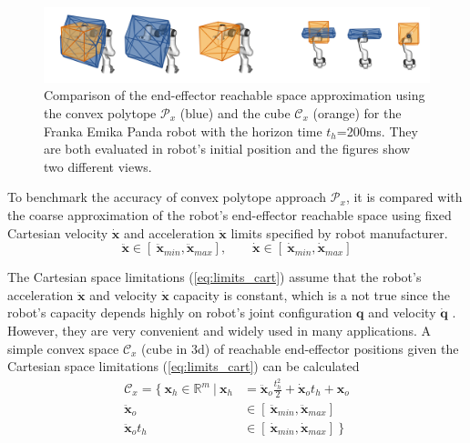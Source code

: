 \begin{figure}[!h]
    \centering
    \includegraphics[width=\linewidth]{Papers/images/comp_200.png}
    \caption{Comparison of the end-effector reachable space approximation using the convex polytope $\mathcal{P}_x$ (blue) and the cube $\mathcal{C}_x$ (orange) for the Franka Emika Panda robot with the horizon time $t_h$=200ms. They are both evaluated in robot's initial position and the figures show two different views.}
    \label{fig:cube}
\end{figure}
To benchmark the accuracy of convex polytope approach $\mathcal{P}_x$, it is compared with the coarse approximation of the robot's end-effector reachable space using fixed Cartesian velocity $\dot{\bm{x}}$ and acceleration $\ddot{\bm{x}}$ limits specified by robot manufacturer.
\begin{equation}
    \ddot{\bm{x}}\in [~ \ddot{\bm{x}}_{min},  \ddot{\bm{x}}_{max}], \qquad \dot{\bm{x}} \in [~ \dot{\bm{x}}_{min},  \dot{\bm{x}}_{max}]
    \label{eq:limits_cart}
\end{equation}



The Cartesian space limitations (\ref{eq:limits_cart}) assume that the robot's acceleration $\ddot{\bm{x}}$ and velocity $\dot{\bm{x}}$ capacity is constant, which is a not true since the robot's capacity depends highly on robot's joint configuration $\bm{q}$ and velocity  $\dot{\bm{q}}$ \cite{Bowling2005}. However, they are very convenient and widely used in many applications. A simple convex space $\mathcal{C}_x$ (cube in 3d) of reachable end-effector positions given the Cartesian space limitations (\ref{eq:limits_cart}) can be calculated
\begin{equation}
\begin{split}
    \mathcal{C}_x = \{ ~\bm{x}_h \in \mathbb{R}^m ~|~ \bm{x}_h &= \ddot{\bm{x}}_o\frac{t_h^2}{2} + \dot{\bm{x}}_ot_h + \bm{x}_o \\
    \ddot{\bm{x}}_o &\in [~ \ddot{\bm{x}}_{min},  \ddot{\bm{x}}_{max}]\\
    \ddot{\bm{x}}_ot_h &\in [~ \dot{\bm{x}}_{min},  \dot{\bm{x}}_{max}] ~\}
\end{split}
\end{equation}

